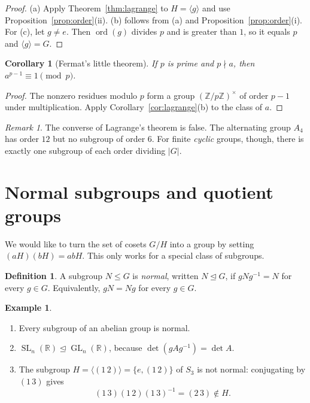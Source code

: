 \documentclass[11pt]{article}
\theoremstyle{plain}
\newtheorem{corollary}[theorem]{Corollary}
\theoremstyle{definition}
\newtheorem{definition}[theorem]{Definition}
\newtheorem{example}[theorem]{Example}
\theoremstyle{remark}
\newtheorem*{remark}{Remark}
\newcommand{\Z}{\mathbb{Z}}
\newcommand{\R}{\mathbb{R}}
\newcommand{\gen}[1]{\langle #1 \rangle}
\DeclareMathOperator{\GL}{GL}
\DeclareMathOperator{\SL}{SL}
\DeclareMathOperator{\ord}{ord}
\begin{document}
\begin{proof}
(a) Apply Theorem~\ref{thm:lagrange} to $H = \gen{g}$ and use Proposition~\ref{prop:order}(ii). (b) follows from (a) and Proposition~\ref{prop:order}(i). For (c), let $g \neq e$. Then $\ord(g)$ divides $p$ and is greater than $1$, so it equals $p$ and $\gen{g} = G$.
\end{proof}

\begin{corollary}[Fermat's little theorem]\label{cor:fermat}
If $p$ is prime and $p \nmid a$, then $a^{p-1} \equiv 1 \pmod{p}$.
\end{corollary}

\begin{proof}
The nonzero residues modulo $p$ form a group $(\Z/p\Z)^\times$ of order $p - 1$ under multiplication. Apply Corollary~\ref{cor:lagrange}(b) to the class of $a$.
\end{proof}

\begin{remark}
The converse of Lagrange's theorem is false. The alternating group $A_4$ has order $12$ but no subgroup of order $6$. For finite \emph{cyclic} groups, though, there is exactly one subgroup of each order dividing $|G|$.
\end{remark}

\section{Normal subgroups and quotient groups}

We would like to turn the set of cosets $G/H$ into a group by setting $(aH)(bH) = abH$. This only works for a special class of subgroups.

\begin{definition}
A subgroup $N \le G$ is \emph{normal}, written $N \trianglelefteq G$, if $gNg^{-1} = N$ for every $g \in G$. Equivalently, $gN = Ng$ for every $g \in G$.
\end{definition}

\begin{example}\label{ex:normal}
\leavevmode
\begin{enumerate}[label=(\alph*)]
  \item Every subgroup of an abelian group is normal.
  \item $\SL_n(\R) \trianglelefteq \GL_n(\R)$, because $\det(gAg^{-1}) = \det A$.
  \item The subgroup $H = \gen{(1\,2)} = \{e, (1\,2)\}$ of $S_3$ is not normal: conjugating by $(1\,3)$ gives
  \[
    (1\,3)(1\,2)(1\,3)^{-1} = (2\,3) \notin H.
  \]
\end{enumerate}
\end{example}
\end{document}
